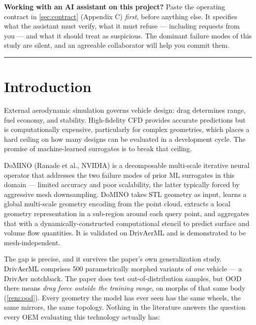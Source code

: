 \documentclass[10pt,a4paper]{article}
\theoremstyle{definition}
\begin{document}
{\small
\noindent\textbf{Working with an AI assistant on this project?} Paste the operating
contract in \cref{sec:contract} (Appendix C) \emph{first}, before anything else. It
specifies what the assistant must verify, what it must refuse --- including requests
from you --- and what it should treat as suspicious. The dominant failure modes of this
study are silent, and an agreeable collaborator will help you commit them.
}
\vspace{4pt}

\tableofcontents
\vspace{6pt}
\hrule
\vspace{6pt}

\section{Introduction}

External aerodynamic simulation governs vehicle design: drag determines range,
fuel economy, and stability. High-fidelity CFD provides accurate predictions but
is computationally expensive, particularly for complex geometries, which places
a hard ceiling on how many designs can be evaluated in a development cycle. The
promise of machine-learned surrogates is to break that ceiling.

DoMINO (Ranade et al., NVIDIA) is a decomposable multi-scale iterative neural
operator that addresses the two failure modes of prior ML surrogates in this
domain --- limited accuracy and poor scalability, the latter typically forced by
aggressive mesh downsampling. DoMINO takes STL geometry as input, learns a
global multi-scale geometry encoding from the point cloud, extracts a local
geometry representation in a sub-region around each query point, and aggregates
that with a dynamically-constructed computational stencil to predict surface and
volume flow quantities. It is validated on DrivAerML and is demonstrated to be
mesh-independent.

The gap is precise, and it survives the paper's own generalization study. DrivAerML
comprises 500 parametrically morphed variants of \emph{one} vehicle --- a DrivAer
notchback. The paper does test out-of-distribution samples, but OOD there means
\emph{drag force outside the training range}, on morphs of that same body
(\cref{rem:ood}). Every geometry the model has ever seen has the same wheels, the same
mirrors, the same topology. Nothing in the literature answers the question every OEM
evaluating this technology actually has:
\end{document}
